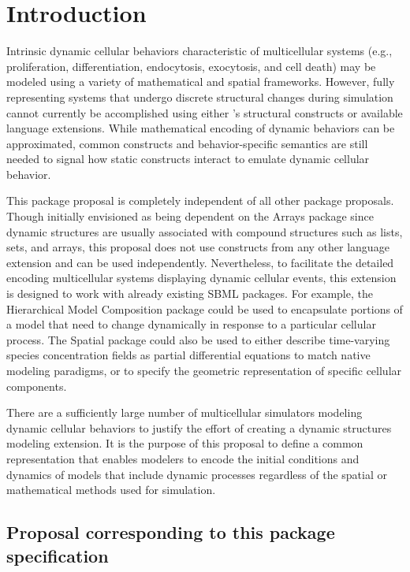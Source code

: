 
\section{Introduction}
\label{sec:intro}

Intrinsic dynamic cellular behaviors characteristic of multicellular systems (e.g., proliferation, differentiation, endocytosis, exocytosis, and cell death) may be modeled using a variety of mathematical and spatial frameworks. However, fully representing systems that undergo discrete structural changes during simulation cannot currently be accomplished using either \sbmlthreecore 's structural constructs or available language extensions. While mathematical encoding of dynamic behaviors can be approximated, common constructs and behavior-specific semantics are still needed to signal how static constructs interact to emulate dynamic cellular behavior.

This package proposal is completely independent of all other package proposals. Though initially envisioned as being dependent on the Arrays package since dynamic structures are usually associated with compound structures such as lists, sets, and arrays, this proposal does not use constructs from any other language extension and can be used independently. Nevertheless, to facilitate the detailed encoding multicellular systems displaying dynamic cellular events, this extension is designed to work with already existing SBML packages. For example, the Hierarchical Model Composition package could be used to encapsulate portions of a model that need to change dynamically in response to a particular cellular process. The Spatial package could also be used to either describe time-varying species concentration fields as partial differential equations to match native modeling paradigms, or to specify the geometric representation of specific cellular components.

There are a sufficiently large number of multicellular simulators modeling dynamic cellular behaviors to justify the effort of creating a dynamic structures modeling extension. It is the purpose of this \sbmlthree proposal to define a common representation that enables modelers to encode the initial conditions and dynamics of  models that include dynamic processes regardless of the spatial or mathematical methods used for simulation.  

\subsection{Proposal corresponding to this package specification}
\label{subsec:intro}

